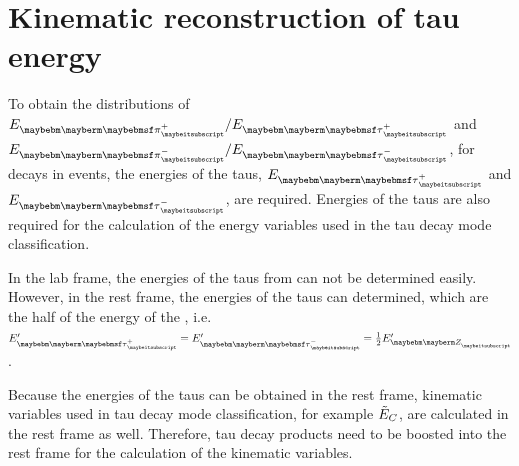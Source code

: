 \section{Kinematic reconstruction of tau energy}

To obtain the distributions of  $E_{\Ppiplus} / E_{\APtauon}$ and $E_{\Ppiminus} / E_{\Ptauon}$, for  \tauToPionBoth decays in \eeZZQQ events, the energies of the taus, $E_{\APtauon}$ and   $E_{\Ptauon}$, are required. Energies of the taus are also required for the calculation of the energy variables used in the tau decay mode classification.

 In the lab frame, the energies of the taus from  \ZToTauTau can not be determined easily. However, in the \PZ rest frame, the energies of the taus can determined, which are the half of the energy of the \PZ, i.e. $E'_{\APtauon} = E'_{\Ptauon} = \frac{1}{2} E'_{\PZ}$.

Because the energies of the taus can be obtained in the \PZ rest frame, kinematic variables used in tau decay mode classification, for example $\tilde{E}_{C}$, are calculated in the \PZ rest frame as well. Therefore, tau decay products need to be boosted into the \PZ rest frame for the calculation of the kinematic variables.

